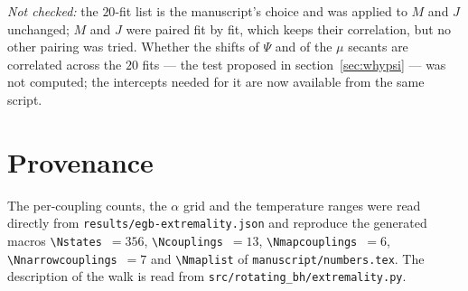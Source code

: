 \documentclass[11pt,a4paper]{article}
\begin{document}
\noindent\emph{Not checked:} the $20$-fit list is the manuscript's choice and
was applied to $M$ and $J$ unchanged; $M$ and $J$ were paired fit by fit, which
keeps their correlation, but no other pairing was tried. Whether the shifts of
$\Psi$ and of the $\mu$ secants are correlated across the $20$ fits --- the test
proposed in section~\ref{sec:whypsi} --- was not computed; the intercepts needed
for it are now available from the same script.

\section*{Provenance}

The per-coupling counts, the $\alpha$ grid and the temperature ranges were read
directly from \texttt{results/egb-extremality.json} and reproduce the generated
macros \texttt{\textbackslash Nstates}~$=356$,
\texttt{\textbackslash Ncouplings}~$=13$,
\texttt{\textbackslash Nmapcouplings}~$=6$,
\texttt{\textbackslash Nnarrowcouplings}~$=7$ and
\texttt{\textbackslash Nmaplist} of \texttt{manuscript/numbers.tex}. The
description of the walk is read from
\texttt{src/rotating\_bh/extremality.py}.
\end{document}
